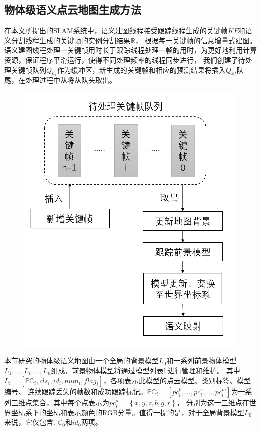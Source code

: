 \subsection{物体级语义点云地图生成方法}
在本文所提出的SLAM系统中，语义建图线程接受跟踪线程生成的关键帧$KF$和语义分割线程生成的关键帧的实例分割结果$\mathbb{R}$，
根据每一关键帧的信息增量式建图。语义建图线程处理一关键帧用时长于跟踪线程处理一帧的用时，为更好地利用计算资源，保证程序平滑运行，使得不同处理频率的线程同步进行，
我们创建了待处理关键帧队列$Q_{kf}$作为缓冲区，新生成的关键帧和相应的预测结果将插入$Q_{kf}$队尾，在处理过程中从将从队头取出。
\begin{figure}[!htbp]
    \centering
    \includegraphics[width=\textwidth]{Img/4-queue.png}
    \label{fig:queue}
\end{figure}
本节研究的物体级语义地图由一个全局的背景模型$L_{0}$和一系列前景物体模型${L_{1},...,L_{i},...,L_{n}}$组成，前景物体模型将通过模型列表$\mathbb{L}$进行管理和维护。
其中$L_{i}=\left[\mathbb{PC}_{i}, cls_{i}, id_{i}, num_{i}, flag_{i} \right]$，各项表示此模型的点云模型、类别标签、模型编号、
连续跟踪丢失的帧数和成功跟踪标记。$\mathbb{PC}_{i}=\left[pc_{i}^{0},...,pc_{i}^{s},...,pc_{i}^{m}\right]$为一系列三维点集合，其中每个点表示为$pc_{i}^{s}=\left \{ x, y, z, b, g, r \right \}$，
分别为这一三维点在世界坐标系下的坐标和表示颜色的RGB分量。值得一提的是，对于全局背景模型$L_{0}$来说，它仅包含$\mathbb{PC}_{0}$和$id_{0}$两项。

